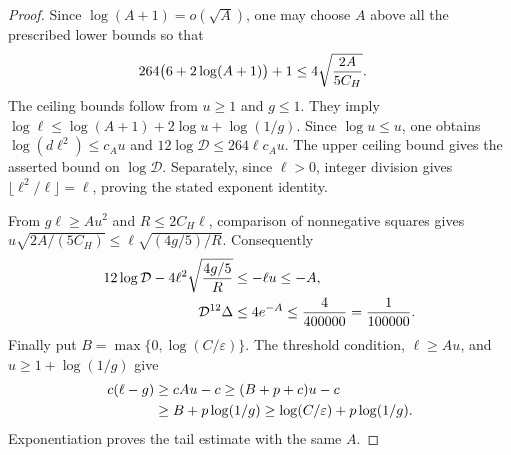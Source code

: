 \begin{proof}\leanok
    Since $\log(A+1)=o(\sqrt A)$, one may choose $A$ above all the prescribed
    lower bounds so that
    \begin{align}
        264\bigl(6+2\log(A+1)\bigr)+1
         & \le4\sqrt{\frac{2A}{5C_H}}.\notag
    \end{align}
    The ceiling bounds follow from $u\ge1$ and $g\le1$. They imply
    $\log\ell\le\log(A+1)+2\log u+\log(1/g)$. Since $\log u\le u$,
    one obtains $\log(d\ell^2)\le c_Au$ and
    $12\log \mathcal D\le264\ell c_Au$.
    The upper ceiling bound gives the asserted bound on $\log\mathcal D$.
    Separately, since $\ell>0$, integer division gives
    $\lfloor\ell^2/\ell\rfloor=\ell$, proving the stated exponent identity.

    From $g\ell\ge Au^2$ and $R\le2C_H\ell$, comparison of nonnegative
    squares gives
    $u\sqrt{2A/(5C_H)}\le\ell\sqrt{(4g/5)/R}$. Consequently
    \begin{align}
        12\log \mathcal D-4\ell^2\sqrt{\frac{4g/5}{R}}
                              & \le-\ell u\le-A,\notag                            \\
        \mathcal D^{12}\Delta & \le4e^{-A}\le\frac4{400000}=\frac1{100000}.\notag
    \end{align}
    Finally put $B=\max\{0,\log(C/\varepsilon)\}$. The threshold condition,
    $\ell\ge Au$, and $u\ge1+\log(1/g)$ give
    \begin{align}
        c(\ell-g) & \ge cAu-c\ge(B+p+c)u-c\notag                             \\
                  & \ge B+p\log(1/g)\ge\log(C/\varepsilon)+p\log(1/g).\notag
    \end{align}
    Exponentiation proves the tail estimate with the same $A$.
\end{proof}

